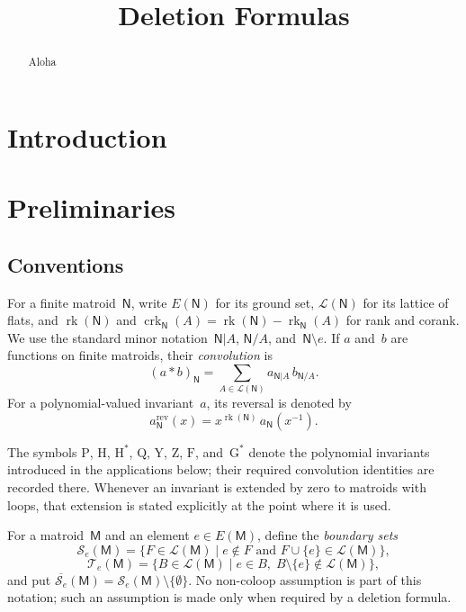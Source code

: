 \documentclass[12pt,letterpaper,english]{amsart}
\title{Deletion Formulas}
\theoremstyle{teoremas}
\theoremstyle{definition}
\DeclareMathOperator{\rk}{rk}
\DeclareMathOperator{\crk}{crk}
\newcommand{\M}{\mathsf{M}}
\newcommand{\N}{\mathsf{N}}
\renewcommand{\H}{\mathrm{H}}
\newcommand{\Hstar}{\mathrm{H}^{*}}
\newcommand{\Gstar}{\mathrm{G}^{*}}
\newcommand{\PP}{\mathrm{P}}
\newcommand{\QQ}{\mathrm{Q}}
\newcommand{\FF}{\mathrm{F}}
\newcommand{\YY}{\mathrm{Y}}
\newcommand{\ZP}{\mathrm{Z}} %
\newcommand{\rev}{\mathrm{rev}}
\newcommand{\Se}{\mathcal{S}_e}
\newcommand{\Te}{\mathcal{T}_e}
\begin{document}
\begin{abstract}
Aloha
\end{abstract}

\maketitle


\section{Introduction}



\section{Preliminaries}

\subsection{Conventions}
For a finite matroid~$\N$, write $E(\N)$ for its ground set,
$\mathcal{L}(\N)$ for its lattice of flats, and $\rk(\N)$ and
$\crk_{\N}(A) = \rk(\N) - \rk_{\N}(A)$ for rank and corank.
We use the standard minor notation~$\N|A$, $\N/A$, and~$\N \setminus e$.
If $a$ and~$b$ are functions on finite matroids, their \emph{convolution} is
\[
(a * b)_{\N}
= \sum_{A \in \mathcal{L}(\N)} a_{\N|A}\, b_{\N/A}.
\]
For a polynomial-valued invariant~$a$, its reversal is denoted by
\[
a^{\rev}_{\N}(x) = x^{\rk(\N)}\, a_{\N}(x^{-1}).
\]

The symbols $\PP$, $\H$, $\Hstar$, $\QQ$, $\YY$, $\ZP$, $\FF$,
and~$\Gstar$ denote the polynomial invariants introduced in the
applications below; their required convolution identities are recorded
there.  Whenever an invariant is extended by zero to matroids with loops,
that extension is stated explicitly at the point where it is used.

For a matroid~$\M$ and an element $e \in E(\M)$, define the
\emph{boundary sets}
\[
\Se(\M) = \{F \in \mathcal{L}(\M) \mid e \notin F
  \text{ and } F \cup \{e\} \in \mathcal{L}(\M)\},
\]
\[
\Te(\M) = \{B \in \mathcal{L}(\M) \mid e \in B,\;
  B \setminus \{e\} \notin \mathcal{L}(\M)\},
\]
and put $\overline{\Se}(\M) = \Se(\M) \setminus \{\emptyset\}$.
No non-coloop assumption is part of this notation; such an assumption
is made only when required by a deletion formula.
\end{document}
